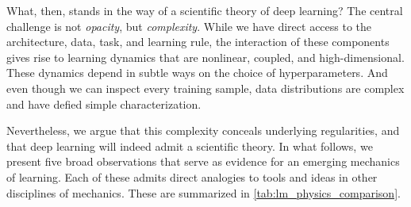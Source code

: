 What, then, stands in the way of a scientific theory of deep learning? The central challenge is not \emph{opacity}, but \emph{complexity}.
While we have direct access to the architecture, data, task, and learning rule, the interaction of these components gives rise to learning dynamics that are nonlinear, coupled, and high-dimensional.
These dynamics depend in subtle ways on the choice of hyperparameters.
And even though we can inspect every training sample, data distributions are complex and have defied simple characterization.


Nevertheless, we argue that this complexity conceals underlying regularities, and that deep learning will indeed admit a scientific theory.
In what follows, we present five broad observations that serve as evidence for an emerging mechanics of learning.
Each of these admits direct analogies to tools and ideas in other disciplines of mechanics.
These are summarized in \cref{tab:lm_physics_comparison}.



